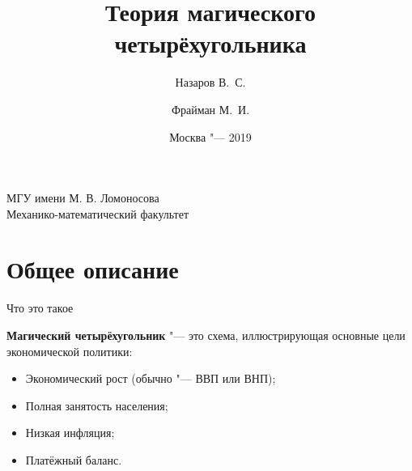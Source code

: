 \documentclass{beamer}
\begin{document}
\title{{Теория магического четырёхугольника}}
\author[%
	Назаров В.\ С. \and Фрайман М.\ И.
]{%
	\scriptsize
	Назаров В.\ С. \and Фрайман М.\ И.
}
\date{\footnotesize{Москва "--- 2019}}


	\begin{frame}
		\begin{center}
			\footnotesize{МГУ имени М. В. Ломоносова}\\
			\footnotesize{Механико-математический факультет}\\\vspace{10pt}
		\end{center}
		\titlepage
	\end{frame}

	\section{Общее описание}

	\begin{frame}{Что это такое}
	
		\textbf{Магический четырёхугольник} "--- это схема, иллюстрирующая основные цели экономической политики:
		\begin{itemize}
			\item Экономический рост (обычно "--- ВВП или ВНП);
			\item Полная занятость населения;
			\item Низкая инфляция;
			\item Платёжный баланс.
		\end{itemize}
		
	\end{frame}
	
\end{document}
